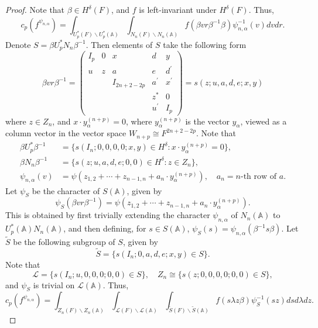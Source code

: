 \documentclass[12pt]{amsart}
\newcommand{\A}{\mathbb{A}}
\newcommand{\wt}{\widetilde}
\theoremstyle{remark}
\begin{document}
\begin{proof}
Note that $\beta\in H^\delta(F)$, and $f$ is left-invariant under $H^{\delta}(F)$. Thus,
\begin{equation*}
c_p(f^{\psi_{n,\alpha}})=\int_{U_p^*(F)\backslash U_p^*(\A)} \int_{N_n(F)\backslash N_n(\A)} f(\beta v r \beta^{-1} \beta )\psi_{n,\alpha}^{-1}(v)dvdr. 	
\end{equation*}
Denote $S=\beta U_p^* N_n \beta^{-1}$. Then elements of $S$ take the following form
\begin{equation}
\label{eq-prop-ConstantTerm-prop1-S}
\beta v r \beta^{-1}= \begin{pmatrix}
 I_p & 0 &x & d &y\\
 u &z &a &e &d^\prime\\
 &&I_{2n+2-2p} & a^\prime &x^\prime\\
 &&&z^* &0\\
 &&&u^\prime & I_p	
 \end{pmatrix}
	=s(z;u,a,d,e;x,y)
\end{equation}
where $z\in Z_{n}$, and $x\cdot y_{\alpha}^{(n+p)}=0$, where $y_{\alpha}^{(n+p)}$ is the vector $y_{\alpha}$, viewed as a column vector in the vector space $W_{n+p}\cong F^{2n+2-2p}$. Note that
\begin{equation*}
\begin{split}
\beta U_p^* \beta^{-1}  &= \{ s(I_n;0,0,0,0;x,y)\in H^\delta: 	x\cdot y_{\alpha}^{(n+p)}=0 \}, \\
\beta N_n \beta^{-1}  &= \{ s(z;u,a,d,e;0,0)\in H^\delta: 	z\in Z_n \},\\
\psi_{n,\alpha}(v)&= \psi(z_{1,2}+\cdots+ z_{n-1,n} + a_{n}\cdot y_{\alpha}^{(n+p)}), \quad a_n=\text{$n$-th row of }a.
\end{split}
\end{equation*}
Let $\psi_S$ be the character of $S(\A)$, given by 
\begin{equation*}
\psi_S(\beta v r \beta^{-1})= 	\psi(z_{1,2}+\cdots+ z_{n-1,n} + a_{n}\cdot y_{\alpha}^{(n+p)}).
\end{equation*}
This is obtained by first trivially extending the character $\psi_{n,\alpha}$ of $N_n(\A)$ to $U_p^*(\A)N_n(\A)$, and then defining, for $s\in S(\A)$, $\psi_S(s)=\psi_{n,\alpha}(\beta^{-1}s\beta)$. 
Let $\wt S$ be the following subgroup of $S$, given by
\begin{equation*}
\wt S=\{s(I_n;0,a,d,e;x,y)\in S\}.	
\end{equation*}
Note that 
\begin{equation*}
\mathcal{L}=\{s(I_n;u,0,0,0;0,0)\in S\}, \quad Z_n\cong\{s(z;0,0,0,0;0,0)\in S\},
\end{equation*}
and $\psi_S$ is trivial on $\mathcal{L}(\A)$.
Thus,
\begin{equation*}
c_p(f^{\psi_{n,\alpha}})=\int_{Z_n(F)\backslash Z_n(\A)} \int_{\mathcal{L}(F)\backslash \mathcal{L}(\A)} \int_{\wt S (F)\backslash \wt S(\A)} f(s \lambda z \beta )\psi_{S}^{-1}(sz) dsd\lambda dz. 	
\end{equation*}


\end{proof}
\end{document}
